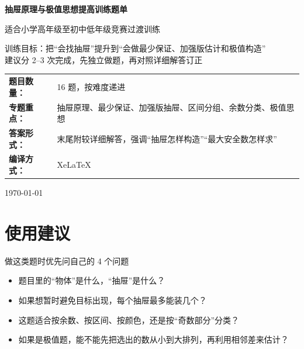 \documentclass[11pt,a4paper,fontset=fandol]{ctexart}
\theoremstyle{formalexample}
\begin{document}
\thispagestyle{empty}
\begin{titlepage}
\centering
\vspace*{0.9cm}
\begin{tcolorbox}[
  enhanced,
  width=0.92\textwidth,
  colback=white,
  colframe=mainblue,
  boxrule=1pt,
  arc=0mm,
  left=6mm,
  right=6mm,
  top=8mm,
  bottom=8mm
]
\centering
{\fontsize{24}{30}\selectfont\bfseries 抽屉原理与极值思想提高训练题单\par}
\vspace{0.6cm}
{\fontsize{17}{22}\selectfont 适合小学高年级至初中低年级竞赛过渡训练\par}

\vspace{1cm}
\begin{tcolorbox}[colback=lightblue,colframe=mainblue,width=0.84\textwidth,boxrule=1pt]
\centering
{\large 训练目标：把“会找抽屉”提升到“会做最少保证、加强版估计和极值构造”}\\[0.35em]
{\normalsize 建议分 2--3 次完成，先独立做题，再对照详细解答订正}
\end{tcolorbox}

\vspace{1cm}
\renewcommand{\arraystretch}{1.42}
\begin{tabular}{>{\bfseries}p{3.5cm}p{8cm}}
题目数量： & 16 题，按难度递进 \\
专题重点： & 抽屉原理、最少保证、加强版抽屉、区间分组、余数分类、极值思想 \\
答案形式： & 末尾附较详细解答，强调“抽屉怎样构造”“最大安全数怎样求” \\
编译方式： & XeLaTeX \\
\end{tabular}

\vspace{0.9cm}
{\large \today\par}
\end{tcolorbox}
\end{titlepage}

\tableofcontents
\newpage

\section{使用建议}

\begin{goalbox}{做这类题时优先问自己的 4 个问题}
\begin{itemize}
  \item 题目里的“物体”是什么，“抽屉”是什么？
  \item 如果想暂时避免目标出现，每个抽屉最多能装几个？
  \item 这题适合按余数、按区间、按颜色，还是按“奇数部分”分类？
  \item 如果是极值题，能不能先把选出的数从小到大排列，再利用相邻差来估计？
\end{itemize}
\end{goalbox}
\end{document}
